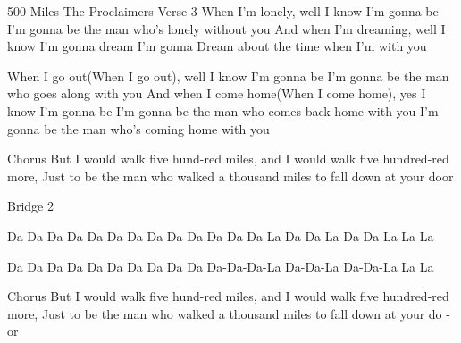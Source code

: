 \begin{song}[]{500 Miles The Proclaimers}
Verse 3
When I'm lonely, well I know I'm gonna be
I'm gonna be the man who's lonely without you
And when I'm dreaming, well I know I'm gonna dream
I'm gonna Dream about the time when I'm with you

When I go out(When I go out), well I know I'm gonna be
I'm gonna be the man who goes along with you
And when I come home(When I come home), yes I know I'm gonna be
I'm gonna be the man who comes back home with you
I'm gonna be the man who's coming home with you


Chorus
But I would walk five hund-red miles, and
I would walk five hundred-red  more,
Just to be the man who walked a thousand  miles to
fall down at your door   

Bridge 2


Da Da Da Da          Da Da Da Da      Da Da Da-Da-Da-La Da-Da-La Da-Da-La La La

Da Da Da Da           Da Da Da Da      Da Da Da-Da-Da-La Da-Da-La Da-Da-La La La


Chorus
But I would walk five hund-red miles, and
I would walk five hundred-red  more,
Just to be the man who walked a thousand  miles to
fall down  at  your  do  -  or 
\end{song}

